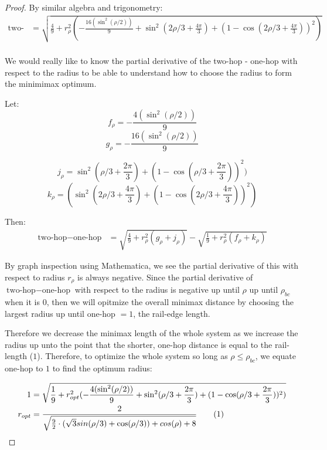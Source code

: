 \documentclass[11pt]{article}
\newcommand\numberthis{\addtocounter{equation}{1}\tag{\theequation}}
\begin{document}
\begin{proof}
By similar algebra and trigonometry:
\begin{align*}
  \text{two-hop}  &= \sqrt{\frac{4}{9} + r_{\rho}^2 (-\frac{16 (\sin^2( \rho / 2))}{9} + \sin^2(2\rho/3 + \frac{4\pi}{3})  + (1 - \cos(2\rho/3 + \frac{4\pi}{3}))^2)} \\
\end{align*}

We would really like to know the partial derivative of the two-hop - one-hop with respect
to the radius to be able to understand how to choose the radius to form the minimimax optimum.

Let:
\begin{equation}
  f_{\rho} = -\frac{4 (\sin^2( \rho / 2))}{9}
  \end{equation}
\begin{equation}
  g_{\rho} = -\frac{16 (\sin^2( \rho / 2))}{9} 
\end{equation}

\begin{equation}
  j_{\rho} = \sin^2(\rho/3+ \frac{2\pi}{3})  + (1 - \cos(\rho/3 + \frac{2\pi}{3}))^2)
\end{equation}
\begin{equation}
  k_{\rho} = (\sin^2(2\rho/3 + \frac{4\pi}{3})  + (1 - \cos(2\rho/3 + \frac{4\pi}{3}))^2)
\end{equation}

Then:
\begin{align*}
  \text{two-hop} - \text{one-hop}  &= \sqrt{\frac{4}{9}  + r_{\rho}^2(g_{\rho}+ j_{\rho})}
  - \sqrt{\frac{1}{9} +r_{\rho}^2(f_{\rho}+k_{\rho}) }
\end{align*}



By graph inspection using Mathematica, we see the partial derivative of this with respect to
radius $r_{\rho}$ is always negative.
Since the partial derivative of $\text{two-hop} - \text{one-hop}$ with respect to the
radius is negative up until $\rho$ up until $\rho_{bc}$ when it is $0$, then
we will opitmize the overall minimax distance by choosing the largest radius
up until one-hop $= 1$, the rail-edge length.


Therefore we decrease the minimax length
of the whole system as we increase the radius
up unto the point that the shorter, one-hop distance is equal to the rail-length ($1$).
Therefore, to optimize the whole system so long as $\rho \leq \rho_{bc}$,
we equate one-hop to $1$ to find the optimum radius:


\begin{align*}
  1 &=  \sqrt{\frac{1}{9}  + r_{opt}^2(-\frac{4 (\sin^2( \rho / 2))}{9} + \sin^2(\rho/3+ \frac{2\pi}{3})  + (1 - \cos(\rho/3 + \frac{2\pi}{3}))^2)} \\
  r_{opt} &= \frac{2}{\sqrt{\frac{9}{2} \cdot ( \sqrt{3} sin(\rho/3) + \cos(\rho/3)) + cos(\rho)+ 8 }} \numberthis  \label{eqrhoopt} \\
\end{align*}


\end{proof}
\end{document}
